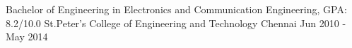 

\begin{cventries}
  \cveducation
    {Bachelor of Engineering in Electronics and Communication Engineering, GPA: 8.2/10.0} %
    {St.Peter's College of Engineering and Technology} %
    {Chennai} %
    {Jun 2010 - May 2014} %
\end{cventries}
